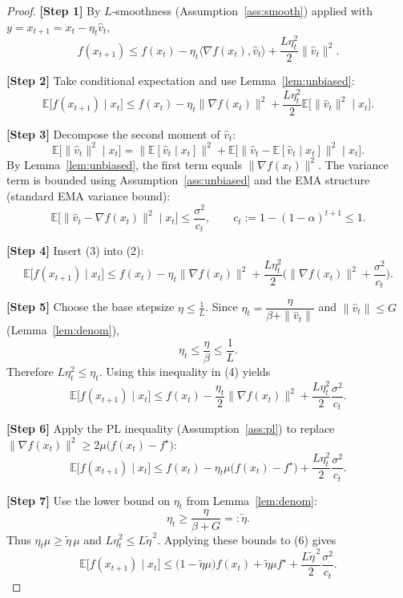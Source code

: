 \documentclass{article}
\begin{document}
\begin{proof}
\textbf{[Step 1]}  By $L$‑smoothness (Assumption~\ref{ass:smooth}) applied with
$y=x_{t+1}=x_t-\eta_t\hat v_t$,
\begin{equation}\label{eq:smooth}
f(x_{t+1})\le f(x_t)-\eta_t\langle\nabla f(x_t),\hat v_t\rangle
+\frac{L\eta_t^{2}}{2}\|\hat v_t\|^{2}.
\end{equation}

\textbf{[Step 2]}  Take conditional expectation and use Lemma~\ref{lem:unbiased}:
\[
\mathbb{E}\big[f(x_{t+1})\mid x_t\big]\le 
f(x_t)-\eta_t\|\nabla f(x_t)\|^{2}
+\frac{L\eta_t^{2}}{2}\mathbb{E}\!\big[\|\hat v_t\|^{2}\mid x_t\big].
\tag{2}
\]

\textbf{[Step 3]}  Decompose the second moment of $\hat v_t$:
\[
\mathbb{E}\!\big[\|\hat v_t\|^{2}\mid x_t\big]
= \|\mathbb{E}[\hat v_t\mid x_t]\|^{2}
   +\mathbb{E}\!\big[\|\hat v_t-\mathbb{E}[\hat v_t\mid x_t]\|^{2}\mid x_t\big].
\]
By Lemma~\ref{lem:unbiased}, the first term equals $\|\nabla f(x_t)\|^{2}$.
The variance term is bounded using Assumption~\ref{ass:unbiased} and the EMA
structure (standard EMA variance bound):
\[
\mathbb{E}\!\big[\|\hat v_t-\nabla f(x_t)\|^{2}\mid x_t\big]\le\frac{\sigma^{2}}{c_t},
\qquad c_t:=1-(1-\alpha)^{t+1}\le1 .
\tag{3}
\]

\textbf{[Step 4]}  Insert (3) into (2):
\[
\mathbb{E}\big[f(x_{t+1})\mid x_t\big]
\le f(x_t)-\eta_t\|\nabla f(x_t)\|^{2}
+\frac{L\eta_t^{2}}{2}\Big(\|\nabla f(x_t)\|^{2}+\frac{\sigma^{2}}{c_t}\Big).
\tag{4}
\]

\textbf{[Step 5]}  Choose the base stepsize $\eta\le\frac{1}{L}$.
Since $\eta_t=\dfrac{\eta}{\beta+\|\hat v_t\|}$ and $\|\hat v_t\|\le G$ (Lemma~\ref{lem:denom}),
\[
\eta_t\le\frac{\eta}{\beta}\le\frac{1}{L}.
\]
Therefore $L\eta_t^{2}\le \eta_t$.  Using this inequality in (4) yields
\[
\mathbb{E}\big[f(x_{t+1})\mid x_t\big]
\le f(x_t)-\frac{\eta_t}{2}\|\nabla f(x_t)\|^{2}
+\frac{L\eta_t^{2}}{2}\frac{\sigma^{2}}{c_t}.
\tag{5}
\]

\textbf{[Step 6]}  Apply the PL inequality (Assumption~\ref{ass:pl}) to replace
$\|\nabla f(x_t)\|^{2}\ge 2\mu\big(f(x_t)-f^\star\big)$:
\[
\mathbb{E}\big[f(x_{t+1})\mid x_t\big]
\le f(x_t)-\eta_t\mu\big(f(x_t)-f^\star\big)
+\frac{L\eta_t^{2}}{2}\frac{\sigma^{2}}{c_t}.
\tag{6}
\]

\textbf{[Step 7]}  Use the lower bound on $\eta_t$ from Lemma~\ref{lem:denom}:
\[
\eta_t\ge\frac{\eta}{\beta+G}=:\tilde\eta.
\]
Thus $\eta_t\mu\ge\tilde\eta\,\mu$ and $L\eta_t^{2}\le L\tilde\eta^{\,2}$.
Applying these bounds to (6) gives
\[
\mathbb{E}\big[f(x_{t+1})\mid x_t\big]
\le \big(1-\tilde\eta\mu\big)f(x_t)+\tilde\eta\mu f^\star
+\frac{L\tilde\eta^{\,2}}{2}\frac{\sigma^{2}}{c_t}.
\tag{7}
\]


\end{proof}
\end{document}
